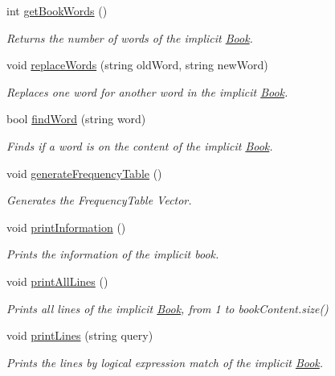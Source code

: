 \begin{DoxyCompactItemize}
int \hyperlink{class_book_a6f0ccce41fd8db486578e0d325605813}{get\+Book\+Words} ()
\begin{DoxyCompactList}\small\item\em Returns the number of words of the implicit \hyperlink{class_book}{Book}. \end{DoxyCompactList}\item 
void \hyperlink{class_book_aaf182e24b86624b6ff54fba2581094a4}{replace\+Words} (string old\+Word, string new\+Word)
\begin{DoxyCompactList}\small\item\em Replaces one word for another word in the implicit \hyperlink{class_book}{Book}. \end{DoxyCompactList}\item 
bool \hyperlink{class_book_af3ceb5ae5d66adf4d594cac8d29294fc}{find\+Word} (string word)
\begin{DoxyCompactList}\small\item\em Finds if a word is on the content of the implicit \hyperlink{class_book}{Book}. \end{DoxyCompactList}\item 
void \hyperlink{class_book_a8d232eaeb4207707d77bc18e6dd467cd}{generate\+Frequency\+Table} ()
\begin{DoxyCompactList}\small\item\em Generates the Frequency\+Table Vector. \end{DoxyCompactList}\item 
void \hyperlink{class_book_a5b67f59017da9d2654c27fa27927a419}{print\+Information} ()
\begin{DoxyCompactList}\small\item\em Prints the information of the implicit book. \end{DoxyCompactList}\item 
void \hyperlink{class_book_a07076ae8fe5e924f18bf7527e0ba5092}{print\+All\+Lines} ()
\begin{DoxyCompactList}\small\item\em Prints all lines of the implicit \hyperlink{class_book}{Book}, from 1 to book\+Content.\+size() \end{DoxyCompactList}\item 
void \hyperlink{class_book_a0c019a8318999229bf506f7f64e67a85}{print\+Lines} (string query)
\begin{DoxyCompactList}\small\item\em Prints the lines by logical expression match of the implicit \hyperlink{class_book}{Book}. \end{DoxyCompactList}\item 

\end{DoxyCompactItemize}
